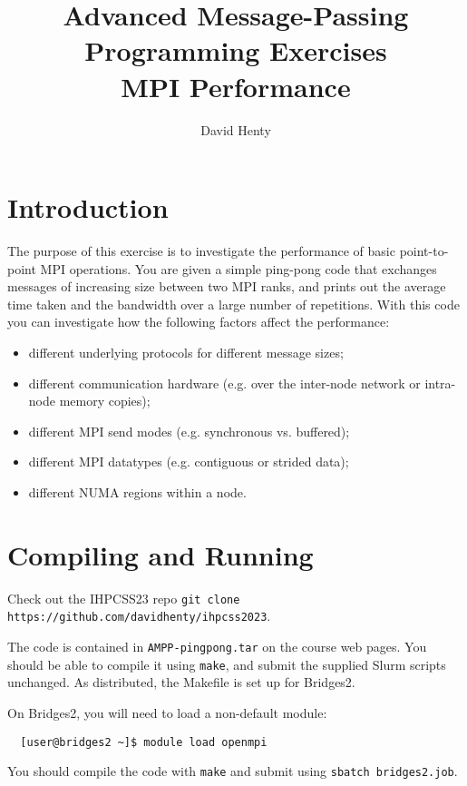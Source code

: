 \documentclass{article}
\begin{document}
\title{Advanced Message-Passing Programming Exercises \\
	MPI Performance}

\author{David Henty}
\date{}
\makeEPCCtitle

\section{Introduction}

The purpose of this exercise is to investigate the performance of
basic point-to-point MPI operations. You are given a simple ping-pong
code that exchanges messages of increasing size between two MPI ranks,
and prints out the average time taken and the bandwidth over a large
number of repetitions. With this code you can investigate how the
following factors affect the performance:

\begin{itemize}

\item different underlying protocols for different message sizes;
\item different communication hardware (e.g. over the inter-node network or
  intra-node memory copies);
\item different MPI send modes (e.g. synchronous vs. buffered);
\item different MPI datatypes (e.g. contiguous or strided data);
\item different NUMA regions within a node.

\end{itemize}

\section{Compiling and Running}

Check out the IHPCSS23 repo \texttt{git clone https://github.com/davidhenty/ihpcss2023}. 

The code is contained in \verb+AMPP-pingpong.tar+ on the course web
pages. You should be able to compile it using \verb+make+, and submit
the supplied Slurm scripts unchanged. As distributed, the Makefile is
set up for Bridges2.

On Bridges2, you will need to load a non-default module:
\begin{verbatim}
  [user@bridges2 ~]$ module load openmpi
\end{verbatim}

You should compile the code with \texttt{make} and submit using \texttt{sbatch bridges2.job}.
\end{document}
